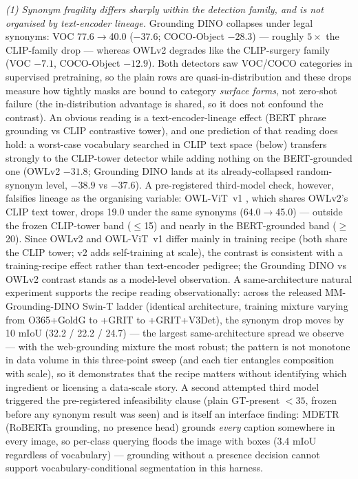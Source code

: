 \documentclass[11pt]{article}
\newcommand{\miou}{mIoU}
\begin{document}
\emph{(1) Synonym fragility differs sharply within the detection family,
and is not organised by text-encoder lineage.} Grounding
DINO collapses under legal synonyms: VOC 77.6$\to$40.0 ($-37.6$; COCO-Object
$-28.3$) --- roughly $5\times$ the CLIP-family drop --- whereas OWLv2 degrades
like the CLIP-surgery family (VOC $-7.1$, COCO-Object $-12.9$). Both
detectors saw VOC/COCO categories in supervised pretraining, so the plain
rows are quasi-in-distribution and these drops measure how tightly masks are
bound to category \emph{surface forms}, not zero-shot failure (the
in-distribution advantage is shared, so it does not confound the contrast).
An obvious reading is a text-encoder-lineage effect (BERT phrase grounding
vs CLIP contrastive tower), and one prediction of that reading does hold: a
worst-case vocabulary searched in CLIP text space (below) transfers strongly
to the CLIP-tower detector while adding nothing on the BERT-grounded one
(OWLv2 $-31.8$; Grounding DINO lands at its already-collapsed random-synonym
level, $-38.9$ vs $-37.6$). A pre-registered third-model check, however,
falsifies lineage as the organising variable: OWL-ViT~v1 \citep{minderer2022owlvit}, which shares
OWLv2's CLIP text tower, drops 19.0 under the same synonyms (64.0$\to$45.0)
--- outside the frozen CLIP-tower band ($\le$15) and nearly in the
BERT-grounded band ($\ge$20). Since OWLv2 and OWL-ViT~v1 differ mainly in
training recipe (both share the CLIP tower; v2 adds self-training at
scale), the contrast is consistent with a training-recipe effect rather
than text-encoder pedigree; the Grounding DINO vs OWLv2 contrast stands as
a model-level observation. A same-architecture natural experiment supports
the recipe reading observationally: across the released MM-Grounding-DINO
Swin-T ladder (identical architecture, training mixture varying from
O365+GoldG to +GRIT to +GRIT+V3Det), the synonym drop moves by 10 \miou{}
(32.2 / 22.2 / 24.7) --- the largest same-architecture spread we observe
--- with the web-grounding mixture the most robust; the pattern is
not monotone in data volume in this three-point sweep (and each tier
entangles composition with scale), so it demonstrates that the recipe
matters without identifying which ingredient or licensing a data-scale
story. A second attempted third model triggered the pre-registered
infeasibility clause (plain GT-present $<35$, frozen before any synonym
result was seen) and is itself an interface finding: MDETR (RoBERTa
grounding, no presence head) grounds \emph{every} caption
somewhere in every image, so per-class querying floods the image with boxes
(3.4 \miou{} regardless of vocabulary) --- grounding without a presence
decision cannot support vocabulary-conditional segmentation in this harness.
\end{document}
